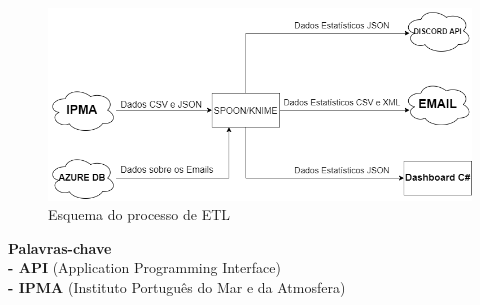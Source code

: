 \begin{figure}[H]
    \includegraphics[scale=0.45]{imagens/Scheme.png}
    \caption{Esquema do processo de ETL}
\end{figure}

\vfill
\footnotesize{\textbf{Palavras-chave \\- API} (Application Programming Interface)}
\footnotesize{\textbf{\\- IPMA} (Instituto Português do Mar e da Atmosfera)}